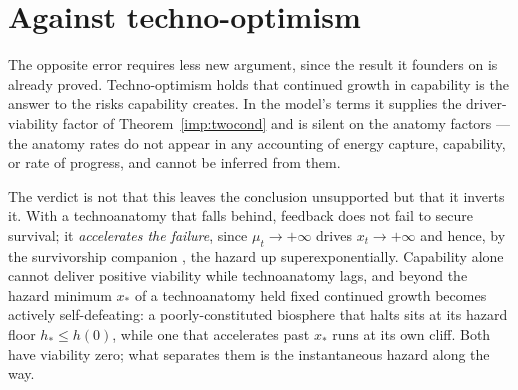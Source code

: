 \section{Against techno-optimism}\label{sec:optimism}


The opposite error requires less new argument, since the result it
founders on is already proved. Techno-optimism holds that continued growth in capability is the answer
to the risks capability creates. In the model's terms it supplies the
driver-viability factor of Theorem~\ref{imp:twocond} and is silent on
the anatomy factors --- the anatomy rates do not appear in any accounting
of energy capture, capability, or rate of progress, and cannot be inferred
from them.

The verdict is not that this leaves the conclusion unsupported but that
it inverts it. With a technoanatomy that falls behind, feedback does not fail to secure survival;
it \emph{accelerates the failure}, since $\mu_t\to+\infty$ drives
$x_t\to+\infty$ and hence, by
the survivorship companion \cite{GoldenSurvivorship}, the hazard up
superexponentially. Capability alone cannot deliver positive viability
while technoanatomy lags, and beyond the hazard minimum $x_\ast$ of a
technoanatomy held fixed continued growth becomes actively self-defeating: a
poorly-constituted biosphere that halts sits at its hazard floor
$h_\ast\le h(0)$, while one that accelerates past $x_\ast$ runs at its
own cliff. Both have viability zero; what separates them is the
instantaneous hazard along the way.

